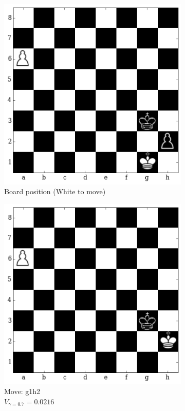 \begin{figure}[H]
\vspace{-0.2in}
\hspace*{-0.5in}  
  \centering
    \begin{subfigure}[t]{\textwidth}
        \centering
        \includegraphics[scale=0.55]{img/table_evaluations/output_15_0.png}
        \caption{Board position (White to move)}
    \end{subfigure}%

 \hspace*{-0.5in}  
    \begin{subfigure}[t]{0.45\textwidth}
        \centering
        
    \includegraphics[width=\textwidth]{img/table_evaluations/output_15_2.png}
        \caption{Move: g1h2 \\
        $V_{\gamma=0.7}=0.0216$}
    \end{subfigure}
   \hspace{1em}
  \centering
    \begin{subfigure}[t]{0.45\textwidth}
        \centering
        

\end{subfigure}
\end{figure}
